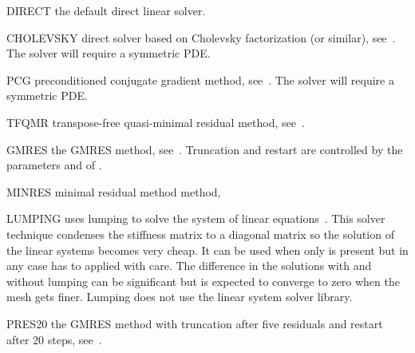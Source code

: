 \begin{memberdesc}[SolverOptions]{DIRECT}
the default direct linear solver.
\end{memberdesc}

\begin{memberdesc}[SolverOptions]{CHOLEVSKY}
direct solver based on Cholevsky factorization (or similar), see~. The solver will require a symmetric PDE.
\end{memberdesc}

\begin{memberdesc}[SolverOptions]{PCG}
preconditioned conjugate gradient method, see~. The solver will require a symmetric PDE.
\end{memberdesc}

\begin{memberdesc}[SolverOptions]{TFQMR}
transpose-free quasi-minimal residual method, see~. \end{memberdesc}

\begin{memberdesc}[SolverOptions]{GMRES}
the GMRES method, see~. Truncation and restart are controlled by the parameters
 and  of .
\end{memberdesc}

\begin{memberdesc}[SolverOptions]{MINRES}
minimal residual method method,  \end{memberdesc}

\begin{memberdesc}[SolverOptions]{LUMPING}
uses lumping to solve the system of linear equations~. This solver technique
condenses the stiffness matrix to a diagonal matrix so the solution of the linear systems becomes very cheap. It can be used when
only  is present but in any case has to applied with care. The difference in the solutions with and without lumping can be significant
but is expected to converge to zero when the mesh gets finer.
Lumping does not use the linear system solver library.
\end{memberdesc}

\begin{memberdesc}[SolverOptions]{PRES20}
the GMRES method with truncation after five residuals and
restart after 20 steps, see~.
\end{memberdesc}

